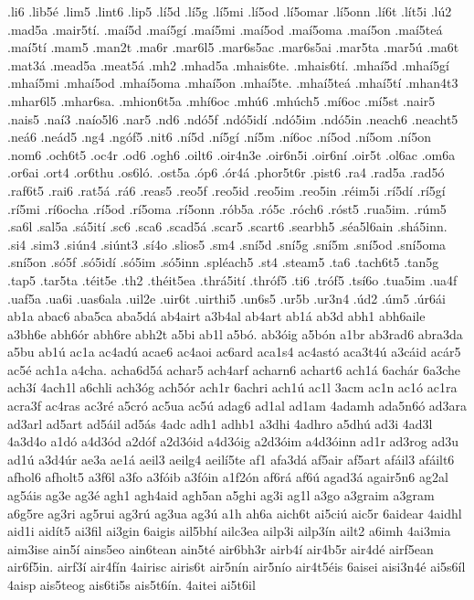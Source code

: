 {.li6
.lib5é
.lim5
.lint6
.lip5
.lí5d
.lí5g
.lí5mi
.lí5od
.lí5omar
.lí5onn
.lí6t
.lít5i
.lú2
.mad5a
.mair5tí.
.maí5d
.maí5gí
.maí5mi
.maí5od
.maí5oma
.maí5on
.maí5teá
.maí5tí
.mam5
.man2t
.ma6r
.mar6l5
.mar6s5ac
.mar6s5ai
.mar5ta
.mar5ú
.ma6t
.mat3á
.mead5a
.meat5á
.mh2
.mhad5a
.mhais6te.
.mhais6tí.
.mhaí5d
.mhaí5gí
.mhaí5mi
.mhaí5od
.mhaí5oma
.mhaí5on
.mhaí5te.
.mhaí5teá
.mhaí5tí
.mhan4t3
.mhar6l5
.mhar6sa.
.mhion6t5a
.mhí6oc
.mhú6
.mhúch5
.mí6oc
.mí5st
.nair5
.nais5
.naí3
.naío5l6
.nar5
.nd6
.ndó5f
.ndó5idí
.ndó5im
.ndó5in
.neach6
.neacht5
.neá6
.neád5
.ng4
.ngóf5
.nit6
.ní5d
.ní5gí
.ní5m
.ní6oc
.ní5od
.ní5om
.ní5on
.nom6
.och6t5
.oc4r
.od6
.ogh6
.oilt6
.oir4n3e
.oir6n5i
.oir6ní
.oir5t
.ol6ac
.om6a
.or6ai
.ort4
.or6thu
.os6ló.
.ost5a
.óp6
.ór4á
.phor5t6r
.pist6
.ra4
.rad5a
.rad5ó
.raf6t5
.rai6
.rat5á
.rá6
.reas5
.reo5f
.reo5id
.reo5im
.reo5in
.réim5i
.rí5dí
.rí5gí
.rí5mi
.rí6ocha
.rí5od
.rí5oma
.rí5onn
.rób5a
.ró5c
.róch6
.róst5
.rua5im.
.rúm5
.sa6l
.sal5a
.sá5ití
.sc6
.sca6
.scad5á
.scar5
.scart6
.searbh5
.séa5l6ain
.shá5inn.
.si4
.sim3
.siún4
.siúnt3
.sí4o
.slios5
.sm4
.sní5d
.sní5g
.sní5m
.sní5od
.sní5oma
.sní5on
.só5f
.só5idí
.só5im
.só5inn
.spléach5
.st4
.steam5
.ta6
.tach6t5
.tan5g
.tap5
.tar5ta
.téit5e
.th2
.théit5ea
.thrá5ití
.thróf5
.ti6
.tróf5
.tsí6o
.tua5im
.ua4f
.uaf5a
.ua6i
.uas6ala
.uil2e
.uir6t
.uirthi5
.un6s5
.ur5b
.ur3n4
.úd2
.úm5
.úr6ái
ab1a
abac6
aba5ca
aba5dá
ab4airt
a3b4al
ab4art
ab1á
ab3d
abh1
abh6aile
a3bh6e
abh6ór
abh6re
abh2t
a5bi
ab1l
a5bó.
ab3óig
a5bón
a1br
ab3rad6
abra3da
a5bu
ab1ú
ac1a
ac4adú
acae6
ac4aoi
ac6ard
aca1s4
ac4astó
aca3t4ú
a3cáid
acár5
ac5é
ach1a
a4cha.
acha6d5á
achar5
ach4arf
acharn6
achart6
ach1á
6achár
6a3che
ach3í
4ach1l
a6chli
ach3óg
ach5ór
ach1r
6achri
ach1ú
ac1l
3acm
ac1n
ac1ó
ac1ra
acra3f
ac4ras
ac3ré
a5cró
ac5ua
ac5ú
adag6
ad1al
ad1am
4adamh
ada5n6ó
ad3ara
ad3arl
ad5art
ad5áil
ad5ás
4adc
adh1
adhb1
a3dhi
4adhro
a5dhú
ad3i
4ad3l
4a3d4o
a1dó
a4d3ód
a2dóf
a2d3óid
a4d3óig
a2d3óim
a4d3óinn
ad1r
ad3rog
ad3u
ad1ú
a3d4úr
ae3a
ae1á
aeil3
aeilg4
aeilí5te
af1
afa3dá
af5air
af5art
afáil3
afáilt6
afhol6
afholt5
a3f6l
a3fo
a3fóib
a3fóin
a1f2ón
af6rá
af6ú
agad3á
agair5n6
ag2al
ag5áis
ag3e
ag3é
agh1
agh4aid
agh5an
a5ghi
ag3i
ag1l
a3go
a3graim
a3gram
a6g5re
ag3ri
ag5rui
ag3rú
ag3ua
ag3ú
a1h
ah6a
aich6t
ai5ciú
aic5r
6aidear
4aidhl
aid1i
aidít5
ai3fil
ai3gin
6aigis
ail5bhí
ailc3ea
ailp3i
ailp3ín
ailt2
a6imh
4ai3mia
aim3ise
ain5í
ains5eo
ain6tean
ain5té
air6bh3r
airb4í
air4b5r
air4dé
airf5ean
air6f5in.
airf3í
air4fín
4airisc
airis6t
air5nín
air5nío
air4t5éis
6aisei
aisi3n4é
ai5s6íl
4aisp
ais5teog
ais6ti5s
ais5t6ín.
4aitei
ai5t6il
}
